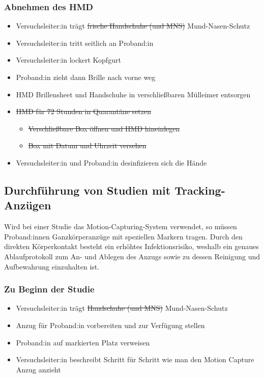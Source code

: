 \subsubsection*{Abnehmen des HMD}

{
\singlespacing
\begin{itemize}
    \item Versuchsleiter:in trägt \sout{frische Handschuhe (und MNS)} Mund-Nasen-Schutz
    \item Versuchsleiter:in tritt seitlich an Proband:in
    \item Versuchsleiter:in lockert Kopfgurt
    \item Proband:in zieht dann Brille nach vorne weg
    \item HMD Brillensheet und Handschuhe in verschließbaren Mülleimer entsorgen
    \item \sout{HMD für 72 Stunden in Quarantäne setzen}
    \begin{itemize}
        \item \sout{Verschließbare Box öffnen und HMD hineinlegen}
        \item \sout{Box mit Datum und Uhrzeit versehen}
    \end{itemize}
    \item Versuchsleiter:in und Proband:in desinfizieren sich die Hände
\end{itemize}
}

\subsection{Durchführung von Studien mit Tracking-Anzügen}\label{subsec:nutzerstudien_mocap}


Wird bei einer Studie das Motion-Capturing-System verwendet, so müssen Proband:innen Ganzkörperanzüge mit speziellen Markern tragen.
Durch den direkten Körperkontakt besteht ein erhöhtes Infektionsrisiko, weshalb ein genaues Ablaufprotokoll zum An- und Ablegen des Anzugs sowie zu dessen Reinigung und Aufbewahrung einzuhalten ist.

\subsubsection*{Zu Beginn der Studie}

{
\singlespacing
\begin{itemize}
    \item Versuchsleiter:in trägt \sout{Handschuhe (und MNS)} Mund-Nasen-Schutz
    \item Anzug für Proband:in vorbereiten und zur Verfügung stellen
    \item Proband:in auf markierten Platz verweisen 
    \item Versuchsleiter:in beschreibt Schritt für Schritt wie man den Motion Capture Anzug anzieht
\end{itemize}
}

